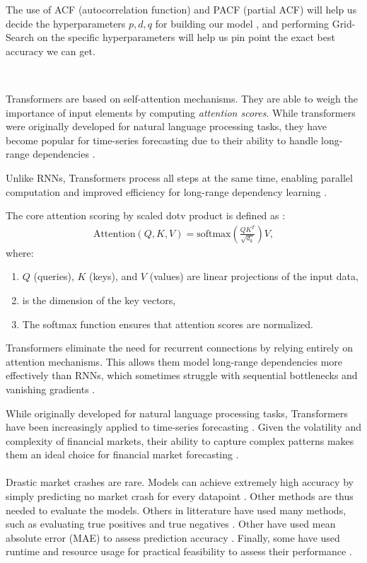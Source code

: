 \documentclass[12pt, letterpaper]{article}
\begin{document}
    The use of ACF (autocorrelation function) and PACF (partial ACF) will help us decide the hyperparameters $p, d, q$ for building our model \cite{hyndman2018}, and performing Grid-Search on the specific hyperparameters will help us pin point the exact best accuracy we can get.
    
    \

    Transformers are based on self-attention mechanisms. They are able to weigh the importance of input elements by computing \textit{attention scores}.
    While transformers were originally developed for natural language processing tasks, they have become popular for time-series forecasting due to their ability to handle long-range dependencies \cite{vaswani2017attention}.



    Unlike RNNs, Transformers process all steps at the same time, enabling parallel computation and improved efficiency for long-range dependency learning \cite{vaswani2017attention}.

The core attention scoring by scaled dotv product is defined as \cite{vaswani2017attention}:
{\small \begin{align*} \text{Attention}(Q, K, V) = \text{softmax}\left(\frac{QK^T}{\sqrt{d_k}}\right)V, \end{align*} }
where:
\begin{enumerate}[label=-] \item $Q$ (queries), $K$ (keys), and $V$ (values) are linear projections of the input data,
\item  is the dimension of the key vectors,
\item The softmax function ensures that attention scores are normalized.
\end{enumerate}

Transformers eliminate the need for recurrent connections by relying entirely on attention mechanisms. This allows them model long-range dependencies more effectively than RNNs, which sometimes struggle with sequential bottlenecks and vanishing gradients \cite{vaswani2017attention}.

While originally developed for natural language processing tasks, Transformers have been increasingly applied to time-series forecasting \cite{zeng2023financial}.
Given the volatility and complexity of financial markets, their ability to capture complex patterns makes them an ideal choice for financial market forecasting \cite{wu2020deep}.

\paragraph*{}
    Drastic market crashes are rare. Models can achieve extremely high accuracy by simply predicting no market crash for every datapoint \cite{market_infrequent}. Other methods are thus needed to evaluate the models. Others in litterature have used many methods, such as evaluating true positives and true negatives \cite{true_positive}. Other have used mean absolute error (MAE) to assess prediction accuracy \cite{hyndman2018}. Finally, some have used runtime and resource usage for practical feasibility to assess their performance \cite{lim2021temporal}.
\end{document}
